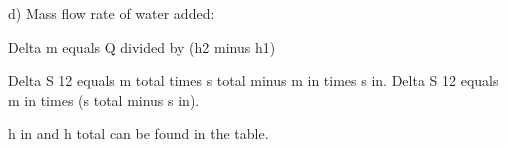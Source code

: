 d) Mass flow rate of water added:  

Delta m equals Q divided by (h2 minus h1)

Delta S 12 equals m total times s total minus m in times s in.  
Delta S 12 equals m in times (s total minus s in).  

h in and h total can be found in the table.